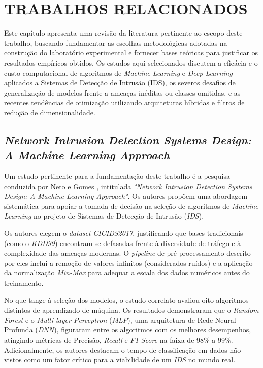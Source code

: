 \chapter{TRABALHOS RELACIONADOS}

Este capítulo apresenta uma revisão da literatura pertinente ao escopo deste trabalho, buscando fundamentar as escolhas metodológicas adotadas na construção do laboratório experimental e fornecer bases teóricas para justificar os resultados empíricos obtidos. Os estudos aqui selecionados discutem a eficácia e o custo computacional de algoritmos de \textit{Machine Learning} e \textit{Deep Learning} aplicados a Sistemas de Detecção de Intrusão (IDS), os severos desafios de generalização de modelos frente a ameaças inéditas ou classes omitidas, e as recentes tendências de otimização utilizando arquiteturas híbridas e filtros de redução de dimensionalidade. 

\section{\textit{Network Intrusion Detection Systems Design: A Machine Learning Approach}}

Um estudo pertinente para a fundamentação deste trabalho é a pesquisa conduzida por Neto e Gomes \cite{neto_gomes}, intitulada \textit{"Network Intrusion Detection Systems Design: A Machine Learning Approach"}. Os autores propõem uma abordagem sistemática para apoiar a tomada de decisão na seleção de algoritmos de \textit{Machine Learning} no projeto de Sistemas de Detecção de Intrusão (\textit{IDS}).

Os autores elegem o \textit{dataset} \textit{CICIDS2017}, justificando que bases tradicionais (como o \textit{KDD99}) encontram-se defasadas frente à diversidade de tráfego e à complexidade das ameaças modernas. O \textit{pipeline} de pré-processamento descrito por eles inclui a remoção de valores infinitos (considerados ruídos) e a aplicação da normalização \textit{Min-Max} para adequar a escala dos dados numéricos antes do treinamento.

No que tange à seleção dos modelos, o estudo correlato avaliou oito algoritmos distintos de aprendizado de máquina. Os resultados demonstraram que o \textit{Random Forest} e o \textit{Multi-layer Perceptron} (\textit{MLP}), uma arquitetura de Rede Neural Profunda (\textit{DNN}), figuraram entre os algoritmos com os melhores desempenhos, atingindo métricas de Precisão, \textit{Recall} e \textit{F1-Score} na faixa de 98\% a 99\%. Adicionalmente, os autores destacam o tempo de classificação em dados não vistos como um fator crítico para a viabilidade de um \textit{IDS} no mundo real.

